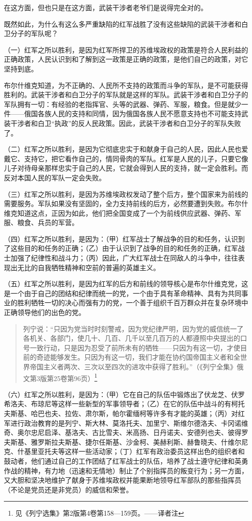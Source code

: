 在这方面，但也只是在这方面，武装干涉者老爷们是说得完全对的。

既然如此，为什么有这么多严重缺陷的红军战胜了没有这些缺陷的武装干涉者和白卫分子的军队呢？

（一）红军之所以胜利，是因为红军所捍卫的苏维埃政权的政策是符合人民利益的正确政策，人民认识到和了解到这一政策是正确的政策，是他们自己的政策，对它坚持到底。

布尔什维克知道，为不正确的、人民所不支持的政策而斗争的军队，是不可能获得胜利的。武装干涉者和白卫分子的军队就是这样的军队。武装干涉者和白卫分子的军队拥有一切：有经验的老指挥官、头等的武器、弹药、军服，粮食。但是就少一件——俄国各族人民的支持和同情，因为俄国各族人民不愿意支持也不可能支持武装干涉者和白卫“执政”的反人民政策。因此，武装干涉者和白卫分子的军队失败了。

（二）红军之所以胜利，是因为它彻底忠实于和献身于自己的人民，因此人民也爱戴它、支持它，把它看作自己的，情同骨肉的军队。红军是人民的儿子，只要它像儿子对待母亲那样忠实于自己的人民，它就会得到人民的支持，就一定会胜利。而反对本国人民的军队一定会失败。

（三）红军之所以胜利，是因为苏维埃政权发动了整个后方，整个国家来为前线的需要服务。军队如果没有坚固的，全力支持前线的后方，必然要遭到失败。布尔什维克知道这点，正因为如此，他们把全国变成了一个为前线供应武器、弹药、军服、粮食、兵员的军营。

（四）红军之所以胜利，是因为：（甲）红军战士了解战争的目的和任务，认识到了这些目的和任务的正确；（乙）由于认识到了战争的目的和任务的正确，红军战士加强了纪律性和战斗力；（丙）因此，广大红军战士在同敌人的斗争中，往往表现出无比的自我牺牲精神和空前的普遍的英雄主义。

（五）红军之所以胜利，是因为红军的后方和前线的领导核心是布尔什维克党，这是一个由于自己的团结和纪律而统一的党，一个由于具有革命精神、具有为共同事业的胜利牺牲一切的决心而强有力的党，一个善于组织千百万群众并在复杂环境中正确领导他们的出色的党。

\begin{quotation}
列宁说：“只因为党当时时刻警戒，因为党纪律严明，因为党的威信统一了各机关、各部门，使几十、几百、几千以至几百万的人都遵照中央提出的口号一致行动，只是因为忍受了前所未有的牺牲——只因为有这一切，才使目前的奇迹能够发生。只因为有这一切，我们才能在协约国帝国主义者和全世界帝国主义者两次、三次以至四次的进攻中获得了胜利。”（《列宁全集》俄文第3版第25卷第96页）\footnote{见《列宁选集》第2版第4卷第158—159页。——译者注}
\end{quotation}

（六）红军之所以胜利，是因为：（甲）它在自己的队伍中锻炼出了伏龙芝、伏罗希洛夫、布琼尼等这样一些新型的军事领导者；（乙）在它的队伍中战斗的有柯托夫斯基、哈巴也夫、拉佐、肃尔斯，帕尔霍缅柯等许多有才能的英雄；（丙）对红军进行政治教育的是列宁、斯大林、莫洛托夫、加里宁、斯维尔德洛夫、卡冈诺维奇、奥尔忠尼启泽、基洛夫、古比雪夫、米高扬、日丹诺夫、安德列也夫、彼得罗夫斯基、雅罗斯拉夫斯基、捷尔任斯基、沙金柯、美赫利斯、赫鲁晓夫、什维尔尼克、什基里亚托夫等这样一些活动家；（丁）红军有政治委员这样出色的组织者和鼓动者，他们通过自己的工作团结了红军战士的队伍，培养了战士遵守纪律和英勇作战的精神，有力地（迅速和无情地）制止了个别指挥员的叛变行为；另一方面，又大胆和坚决地维护了献身于苏维埃政权并能果断地领导红军部队的那些指挥员（不论是党员还是非党员）的威信和荣誉。

